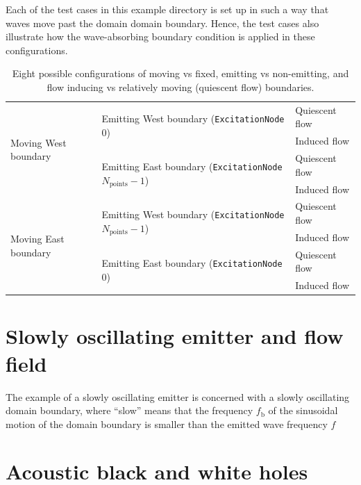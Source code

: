 Each of the test cases in this example directory is set up in such a way that waves move past the domain domain boundary. Hence, the test cases also illustrate how the wave-absorbing boundary condition is applied in these configurations.


\begin{table}[htb]
\centering
\begin{tabular}{|l|l|l|}
\hline
\multirow{4}{*}{Moving West boundary} & \multirow{2}{*}{Emitting West boundary ({\tt ExcitationNode} 0)} & Quiescent flow \\
\cline{3-3}
& & Induced flow \\
\cline{2-3}
& \multirow{2}{*}{Emitting East boundary ({\tt ExcitationNode} $N_{\mathrm{points}}-1$)} & Quiescent flow \\
\cline{3-3}
& & Induced flow \\
\cline{1-3}
\multirow{4}{*}{Moving East boundary} & \multirow{2}{*}{Emitting West boundary ({\tt ExcitationNode} $N_{\mathrm{points}}-1$)} & Quiescent flow \\
\cline{3-3}
& & Induced flow \\
\cline{2-3}
& \multirow{2}{*}{Emitting East boundary ({\tt ExcitationNode} $0$)} & Quiescent flow \\
\cline{3-3}
& & Induced flow \\
\hline
\end{tabular}
\caption{Eight possible configurations of moving vs fixed, emitting vs non-emitting, and flow inducing vs relatively moving (quiescent flow) boundaries.}
\label{tab:hierarchyMotion}
\end{table}


\section{Slowly oscillating emitter and flow field}
\label{sec:Slowly oscillating emitter and flow field}


The example of a slowly oscillating emitter is concerned with a slowly oscillating domain boundary, where ``slow'' means that the frequency $f_{\mathrm{b}}$ of the sinusoidal motion of the domain boundary is smaller than the emitted wave frequency $f$


\section{Acoustic black and white holes}
\label{sec:AAcoustic black and white holes}

